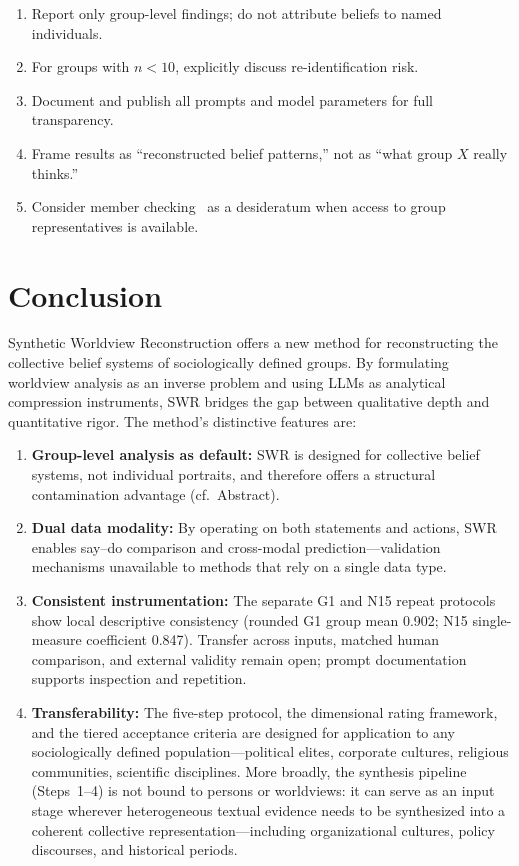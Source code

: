 \documentclass[11pt,a4paper]{article}
\begin{document}
\begin{enumerate}[nosep]
  \item Report only group-level findings; do not attribute beliefs to named individuals.
  \item For groups with $n < 10$, explicitly discuss re-identification risk.
  \item Document and publish all prompts and model parameters for full transparency.
  \item Frame results as ``reconstructed belief patterns,'' not as ``what group $X$ really thinks.''
  \item Consider member checking~\citep{SoysalTurkmen2024} as a desideratum when access to group representatives is available.
\end{enumerate}


\section{Conclusion}
\label{sec:conclusion}

Synthetic Worldview Reconstruction offers a new method for reconstructing the collective belief systems of sociologically defined groups. By formulating worldview analysis as an inverse problem and using LLMs as analytical compression instruments, SWR bridges the gap between qualitative depth and quantitative rigor. The method's distinctive features are:

\begin{enumerate}[nosep]
  \item \textbf{Group-level analysis as default:} SWR is designed for collective belief systems, not individual portraits, and therefore offers a structural contamination advantage (cf.\ Abstract).
  \item \textbf{Dual data modality:} By operating on both statements and actions, SWR enables say--do comparison and cross-modal prediction---validation mechanisms unavailable to methods that rely on a single data type.
  \item \textbf{Consistent instrumentation:} The separate G1 and N15 repeat protocols show local descriptive consistency (rounded G1 group mean 0.902; N15 single-measure coefficient 0.847). Transfer across inputs, matched human comparison, and external validity remain open; prompt documentation supports inspection and repetition.
  \item \textbf{Transferability:} The five-step protocol, the dimensional rating framework, and the tiered acceptance criteria are designed for application to any sociologically defined population---political elites, corporate cultures, religious communities, scientific disciplines. More broadly, the synthesis pipeline (Steps~1--4) is not bound to persons or worldviews: it can serve as an input stage wherever heterogeneous textual evidence needs to be synthesized into a coherent collective representation---including organizational cultures, policy discourses, and historical periods.
\end{enumerate}
\end{document}
